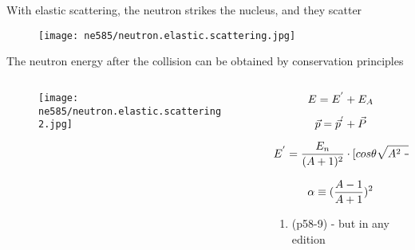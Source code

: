 \documentclass[aspectratio=1610,pdftex,dvipsnames,compress,xcolor={dvipsnames}]{beamer}
\begin{document}
\begin{frame}{With elastic scattering, the neutron strikes the nucleus, and they scatter}
    \begin{figure}
        \centering
        \texttt{[image: ne585/neutron.elastic.scattering.jpg]}
    \end{figure}
\end{frame}


\begin{frame}{The neutron energy after the collision can be obtained by conservation principles}
    \begin{columns}[t]

        \begin{column}{0.40\textwidth}
            \begin{figure}
                \centering
                \texttt{[image: ne585/neutron.elastic.scattering2.jpg]}
            \end{figure}
        \end{column}

        \begin{column}{0.60\textwidth}

            \begin{equation}
                \Large
                E = E^{'} + E_A
            \end{equation}

            \begin{equation}
                \Large
                \vec{p} = \vec{p}^{'} + \vec{P}
            \end{equation}

            \begin{equation}
                \Large
                E^{'} = \frac{E_n}{(A+1)^2} \cdot [cos \theta \sqrt{A^2 - sin^2 \theta}]^2
            \end{equation}

            \begin{equation}
                \Large
                \alpha \equiv (\frac{A - 1}{A + 1})^2
            \end{equation}

            \vspace*{\fill}

            \begin{enumerate}[series=outerlist,topsep=0pt,itemsep=21pt,leftmargin=*,label=(\arabic*)]
                \item[](p58-9) - but in any edition
            \end{enumerate}
        \end{column}

    \end{columns}
\end{frame}
\end{document}
